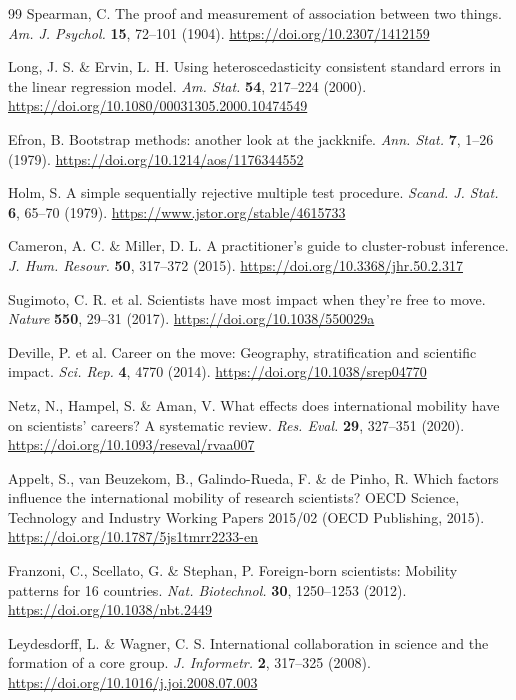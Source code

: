 \begin{thebibliography}{99}
Spearman, C. The proof and measurement of association between two things. \textit{Am. J. Psychol.} \textbf{15}, 72--101 (1904). \url{https://doi.org/10.2307/1412159}

Long, J. S. \& Ervin, L. H. Using heteroscedasticity consistent standard errors in the linear regression model. \textit{Am. Stat.} \textbf{54}, 217--224 (2000). \url{https://doi.org/10.1080/00031305.2000.10474549}

Efron, B. Bootstrap methods: another look at the jackknife. \textit{Ann. Stat.} \textbf{7}, 1--26 (1979). \url{https://doi.org/10.1214/aos/1176344552}

Holm, S. A simple sequentially rejective multiple test procedure. \textit{Scand. J. Stat.} \textbf{6}, 65--70 (1979). \url{https://www.jstor.org/stable/4615733}

Cameron, A. C. \& Miller, D. L. A practitioner's guide to cluster-robust inference. \textit{J. Hum. Resour.} \textbf{50}, 317--372 (2015). \url{https://doi.org/10.3368/jhr.50.2.317}

Sugimoto, C. R. et al. Scientists have most impact when they're free to move. \textit{Nature} \textbf{550}, 29--31 (2017). \url{https://doi.org/10.1038/550029a}

Deville, P. et al. Career on the move: Geography, stratification and scientific impact. \textit{Sci. Rep.} \textbf{4}, 4770 (2014). \url{https://doi.org/10.1038/srep04770}

Netz, N., Hampel, S. \& Aman, V. What effects does international mobility have on scientists’ careers? A systematic review. \textit{Res. Eval.} \textbf{29}, 327--351 (2020). \url{https://doi.org/10.1093/reseval/rvaa007}

Appelt, S., van Beuzekom, B., Galindo-Rueda, F. \& de Pinho, R. Which factors influence the international mobility of research scientists? OECD Science, Technology and Industry Working Papers 2015/02 (OECD Publishing, 2015). \url{https://doi.org/10.1787/5js1tmrr2233-en}

Franzoni, C., Scellato, G. \& Stephan, P. Foreign-born scientists: Mobility patterns for 16 countries. \textit{Nat. Biotechnol.} \textbf{30}, 1250--1253 (2012). \url{https://doi.org/10.1038/nbt.2449}

Leydesdorff, L. \& Wagner, C. S. International collaboration in science and the formation of a core group. \textit{J. Informetr.} \textbf{2}, 317--325 (2008). \url{https://doi.org/10.1016/j.joi.2008.07.003}


\end{thebibliography}
